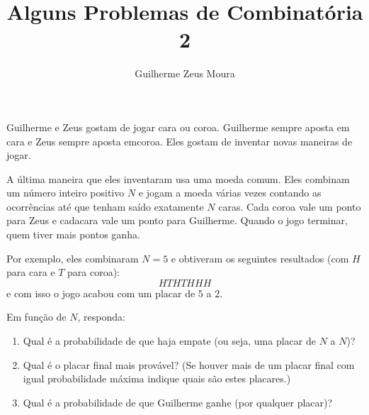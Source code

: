 \documentclass[10pt,a4paper]{article}
\title{Alguns Problemas de Combinatória 2}
\author{Guilherme Zeus Moura}
\renewcommand\playerA[1]{Guilherme}
\renewcommand\playerB[1]{Zeus}
\begin{document}
	
	\zeustitle
	\begin{prob}
		\playerA{Rosencrantz} e \playerB{Guildenstern} gostam de jogar cara ou coroa.
		\playerA{Rosencrantz} sempre aposta em cara e \playerB{Guildenstern} sempre aposta emcoroa. 
		Eles gostam de inventar novas maneiras de jogar.
		
		A última maneira que eles inventaram usa uma moeda comum. 
		Eles combinam um número inteiro positivo $N$ e jogam a moeda várias vezes contando as ocorrências até que tenham saído exatamente $N$ caras.
		Cada coroa vale um ponto para \playerB{Guildenstern} e cadacara vale um ponto para \playerA{Rosencrantz}.
		Quando o jogo terminar, quem tiver mais pontos ganha.
		
		Por exemplo, eles combinaram $N = 5$ e obtiveram os seguintes resultados (com $H$ para cara e $T$ para coroa): $$HTHTHHH$$ e com isso o jogo acabou com um placar de $5$ a $2$.
		
		Em função de $N$, responda:
		\begin{enumerate}[label = (\alph*)]
			\item Qual é a probabilidade de que haja empate (ou seja, uma placar de $N$ a $N$)?
			\item Qual é o placar final mais provável?
				(Se houver mais de um placar final com igual probabilidade máxima indique quais são estes placares.)
			\item Qual é a probabilidade de que \playerA{Rosencrantz} ganhe (por qualquer placar)?
		\end{enumerate}
	\end{prob}
\end{document}
